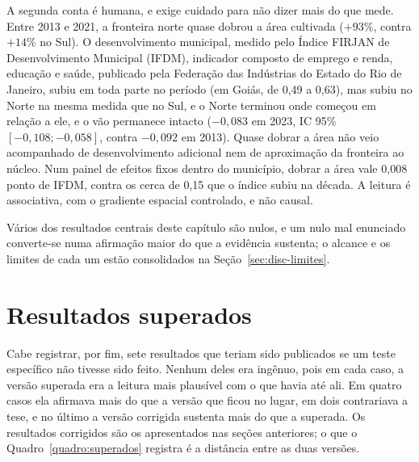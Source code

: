 A segunda conta é humana, e exige cuidado para não dizer mais do que mede.
Entre 2013 e 2021, a fronteira norte quase dobrou a área cultivada
($+93\%$, contra $+14\%$ no Sul). O desenvolvimento municipal, medido pelo
Índice FIRJAN de Desenvolvimento Municipal (IFDM), indicador composto de
emprego e renda, educação e saúde, publicado pela Federação das Indústrias do
Estado do Rio de Janeiro, subiu em toda parte no período (em Goiás, de
0,49 a 0,63), mas
subiu no Norte na mesma medida que no Sul, e o Norte terminou onde começou
em relação a ele, e o vão permanece intacto ($-0{,}083$ em 2023, IC 95\%
$[-0{,}108; -0{,}058]$, contra $-0{,}092$ em 2013). Quase dobrar a área não
veio acompanhado de desenvolvimento adicional nem de aproximação da fronteira
ao núcleo. Num
painel de efeitos fixos dentro do município, dobrar a área vale 0,008 ponto
de IFDM, contra os cerca de 0,15 que o índice subiu na década. A leitura é
associativa, com o gradiente espacial controlado, e não causal.

Vários dos resultados centrais deste capítulo são nulos, e um nulo mal
enunciado converte-se numa afirmação maior do que a evidência sustenta; o
alcance e os limites de cada um estão consolidados na
Seção~\ref{sec:disc-limites}.

\section{Resultados superados}
\label{sec:superados}

Cabe registrar, por fim, sete resultados que teriam sido publicados se um
teste específico não tivesse sido feito. Nenhum deles era ingênuo, pois em cada
caso, a versão superada era a leitura mais plausível com o que havia até ali.
Em quatro casos ela afirmava mais do que a versão que ficou no lugar, em dois
contrariava a tese, e no último a versão corrigida sustenta mais do que a
superada. Os resultados corrigidos são os apresentados nas seções anteriores;
o que o Quadro~\ref{quadro:superados} registra é a distância entre as duas
versões.

